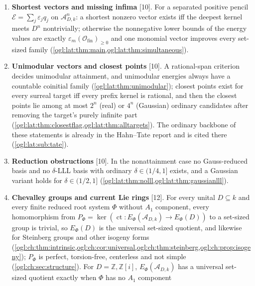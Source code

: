 \documentclass[11pt,oneside]{article}
\numberwithin{equation}{section}
\theoremstyle{definition}
\theoremstyle{remark}
\newcommand{\Z}{\mathbb Z}
\newcommand{\Q}{\mathbb Q}
\newcommand{\A}{\mathcal A}
\newcommand{\cE}{\mathcal E}
\newcommand{\Ofin}{\mathcal O_{\mathrm{fin}}}
\newcommand{\ct}{\operatorname{ct}}
\newcommand{\src}[1]{\textup{\textsf{\small[#1]}}}
\newcommand{\mergetag}{\textup{\textsf{\small[merge]}}}
\begin{document}
\begin{enumerate}[label=\textup{(\arabic*)},leftmargin=*,itemsep=3pt]
(\cref{ogl:ker:cor:profinite}). In the set-sized ring of normal forms with
fewer than $\kappa$ exponents in $\bigoplus_{\alpha<\kappa}\Q$, $\kappa$
regular uncountable, the kernel has no nontrivial image of cardinality below
$\kappa$ (\cref{ogl:ker:thm:fragmentgroup}); combined with the sibling
report's field bound, each nonidentity kernel element has least detecting
group of cardinality exactly $\kappa^{<\kappa}$ \mergetag{}
(\cref{ogl:ker:prop:exact}).
\item \textbf{Shortest vectors and missing infima} \src{10}. For a separated
positive pencil $\cE=\sum_j\varepsilon_jq_j$ on $\A_{D,k}^n$: a shortest nonzero
vector exists iff the deepest kernel meets $D^n$ nontrivially; otherwise the
nonnegative lower bounds of the energy values are exactly
$\varepsilon_m(\Ofin)_{\ge0}$ and one monomial vector improves every set-sized
family (\cref{ogl:lat:thm:main,ogl:lat:thm:simultaneous}).
\item \textbf{Unimodular vectors and closest points} \src{10}. A rational-span
criterion decides unimodular attainment, and unimodular energies always have a
countable coinitial family (\cref{ogl:lat:thm:unimodular}); closest points
exist for every surreal target iff every prefix kernel is rational, and then
the closest points lie among at most $2^n$ (real) or $4^n$ (Gaussian) ordinary
candidates after removing the target's purely infinite part
(\cref{ogl:lat:thm:closestflag,ogl:lat:thm:alltargets}). The ordinary
backbone of these statements is already in the Hahn--Tate report and is cited
there (\cref{ogl:lat:sub:tate}).
\item \textbf{Reduction obstructions} \src{10}. In the nonattainment case no
Gauss-reduced basis and no $\delta$-LLL basis with ordinary
$\delta\in(1/4,1]$ exists, and a Gaussian variant holds for $\delta\in(1/2,1]$
(\cref{ogl:lat:thm:nolll,ogl:lat:thm:gaussianlll}).
\item \textbf{Chevalley groups and current Lie rings} \src{12}. For every unital
$D\subseteq k$ and every finite reduced root system $\Phi$ without $A_1$
component, every homomorphism from $P_\Phi=\ker(\ct:E_\Phi(\A_{D,k})\to E_\Phi(D))$
to a set-sized group is trivial, so $E_\Phi(D)$ is the universal set-sized
quotient, and likewise for Steinberg groups and other isogeny forms
(\cref{ogl:ch:thm:intrinsic,ogl:ch:cor:universal,ogl:ch:thm:steinberg,ogl:ch:prop:isogeny});
$P_\Phi$ is perfect, torsion-free, centerless and not simple
(\cref{ogl:ch:sec:structure}). For $D=\Z,\Z[i]$, $E_\Phi(\A_{D,k})$ has a
universal set-sized quotient exactly when $\Phi$ has no $A_1$ component

\end{enumerate}
\end{document}
